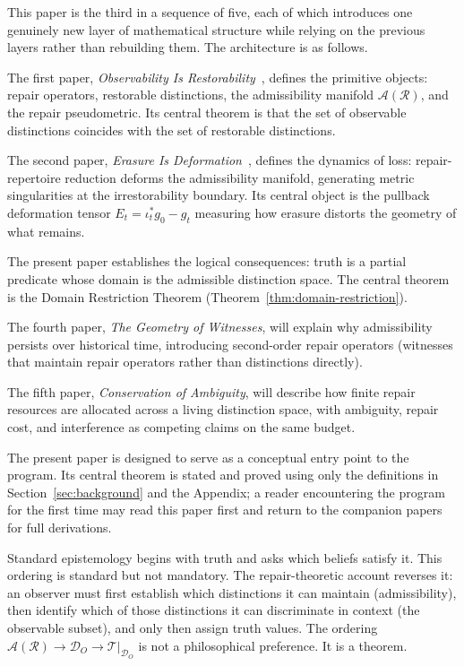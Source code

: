 \documentclass[12pt, oneside]{article}
\theoremstyle{plain}
\theoremstyle{definition}
\theoremstyle{remark}
\newcommand{\AO}{\mathcal{A}}
\begin{document}
This paper is the third in a sequence of five, each of which
introduces one genuinely new layer of mathematical structure while
relying on the previous layers rather than rebuilding them.
The architecture is as follows.

The first paper, \emph{Observability Is Restorability}~\cite{Flyxion2026a},
defines the primitive objects: repair operators, restorable
distinctions, the admissibility manifold $\AO(\mathcal{R})$, and
the repair pseudometric.
Its central theorem is that the set of observable distinctions
coincides with the set of restorable distinctions.

The second paper, \emph{Erasure Is Deformation}~\cite{Flyxion2026b},
defines the dynamics of loss: repair-repertoire reduction deforms
the admissibility manifold, generating metric singularities at the
irrestorability boundary.
Its central object is the pullback deformation tensor
$E_t = \iota_t^* g_0 - g_t$ measuring how erasure distorts the
geometry of what remains.

The present paper establishes the logical consequences: truth is a
partial predicate whose domain is the admissible distinction space.
The central theorem is the Domain Restriction Theorem
(Theorem~\ref{thm:domain-restriction}).

The fourth paper, \emph{The Geometry of Witnesses}, will explain
why admissibility persists over historical time, introducing
second-order repair operators (witnesses that maintain repair
operators rather than distinctions directly).

The fifth paper, \emph{Conservation of Ambiguity}, will describe
how finite repair resources are allocated across a living distinction
space, with ambiguity, repair cost, and interference as competing
claims on the same budget.

The present paper is designed to serve as a conceptual entry point
to the program.
Its central theorem is stated and proved using only the definitions
in Section~\ref{sec:background} and the Appendix; a reader
encountering the program for the first time may read this paper
first and return to the companion papers for full derivations.

Standard epistemology begins with truth and asks which beliefs
satisfy it.
This ordering is standard but not mandatory.
The repair-theoretic account reverses it: an observer must first
establish which distinctions it can maintain (admissibility), then
identify which of those distinctions it can discriminate in context
(the observable subset), and only then assign truth values.
The ordering $\mathcal{A}(\mathcal{R}) \to \mathcal{D}_O \to
\mathcal{T}|_{\mathcal{D}_O}$ is not a philosophical preference.
It is a theorem.
\end{document}
